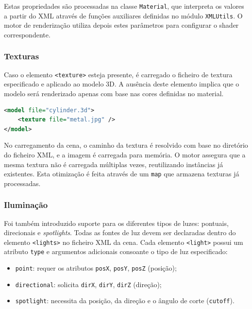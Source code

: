 \documentclass[12pt, a4paper]{article}
\begin{document}
Estas propriedades são processadas na classe \texttt{Material}, que interpreta os valores a partir
do XML através de funções auxiliares definidas no módulo \texttt{XMLUtils}. O motor de renderização
utiliza depois estes parâmetros para configurar o shader correspondente.

\subsubsection{Texturas}

Caso o elemento \texttt{<texture>} esteja presente, é carregado o ficheiro de textura especificado
e aplicado ao modelo 3D. A ausência deste elemento implica que o modelo será renderizado apenas com
base nas cores definidas no material.

\begin{lstlisting}[language=xml]
<model file="cylinder.3d">
    <texture file="metal.jpg" />
</model>
\end{lstlisting}

No carregamento da cena, o caminho da textura é resolvido com base no diretório do ficheiro XML, e
a imagem é carregada para memória. O motor assegura que a mesma textura não é carregada múltiplas
vezes, reutilizando instâncias já existentes. Esta otimização é feita através de um \texttt{map}
que armazena texturas já processadas.

\subsubsection{Iluminação}

Foi também introduzido suporte para os diferentes tipos de luzes: pontuais, direcionais e
\emph{spotlights}. Todas as fontes de luz devem ser declaradas dentro do elemento \texttt{<lights>}
no ficheiro XML da cena. Cada elemento \texttt{<light>} possui um atributo \texttt{type} e
argumentos adicionais consoante o tipo de luz especificado:

\begin{itemize}
    \item \texttt{point}: requer os atributos \texttt{posX}, \texttt{posY}, \texttt{posZ} (posição);
    \item \texttt{directional}: solicita \texttt{dirX}, \texttt{dirY}, \texttt{dirZ} (direção);
    \item \texttt{spotlight}: necessita da posição, da direção e o ângulo de corte
    (\texttt{cutoff}).
\end{itemize}
\end{document}
